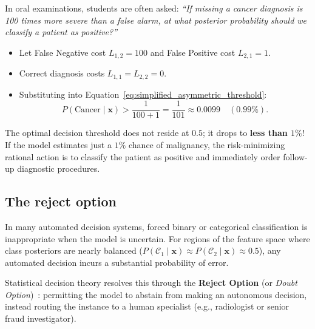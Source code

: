 \begin{examinsight}
In oral examinations, students are often asked: \emph{``If missing a cancer diagnosis is 100 times more severe than a false alarm, at what posterior probability should we classify a patient as positive?''}
\begin{itemize}[noitemsep]
  \item Let False Negative cost $L_{1, 2} = 100$ and False Positive cost $L_{2, 1} = 1$.
  \item Correct diagnosis costs $L_{1, 1} = L_{2, 2} = 0$.
  \item Substituting into Equation~\eqref{eq:simplified_asymmetric_threshold}:
  \begin{equation}
  P(\text{Cancer} \mid \mathbf{x}) > \frac{1}{100 + 1} = \frac{1}{101} \approx 0.0099 \quad (0.99\%).
  \end{equation}
\end{itemize}
The optimal decision threshold does not reside at $0.5$; it drops to \textbf{less than $1\%$}! If the model estimates just a $1\%$ chance of malignancy, the risk-minimizing rational action is to classify the patient as positive and immediately order follow-up diagnostic procedures.
\end{examinsight}

\subsection{The reject option}
\label{sec:reject_option}

In many automated decision systems, forced binary or categorical classification is inappropriate when the model is uncertain. For regions of the feature space where class posteriors are nearly balanced ($P(\mathcal{C}_1 \mid \mathbf{x}) \approx P(\mathcal{C}_2 \mid \mathbf{x}) \approx 0.5$), any automated decision incurs a substantial probability of error.

Statistical decision theory resolves this through the \textbf{Reject Option} (or \emph{Doubt Option})~\cite{bishop2024deep}: permitting the model to abstain from making an autonomous decision, instead routing the instance to a human specialist (e.g., radiologist or senior fraud investigator).

